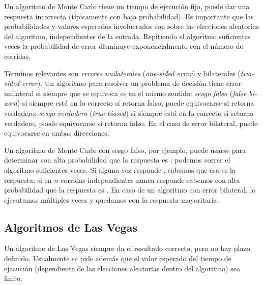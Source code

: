    Un algoritmo de Monte Carlo tiene un tiempo de ejecución fijo,
   puede dar una respuesta incorrecta
   (típicamente con baja probabilidad).
   Es importante que las probabilidades y valores esperados involucrados
   son sobre las elecciones aleatorias del algoritmo,
   independientes de la entrada.
   Repitiendo el algoritmo suficientes veces
   la probabilidad de error
   disminuye exponencialmente con el número de corridas.

   Términos relevantes son \emph{errores unilaterales}
   (\emph{\foreignlanguage{english}{one-sided error}})
   y bilaterales
   (\emph{\foreignlanguage{english}{two-sided error}}).
   Un algoritmo para resolver un problema de decisión tiene error unilateral
   si siempre que se equivoca es en el mismo sentido:
   \emph{sesgo falso}
   (\emph{\foreignlanguage{english}{false biased}})
   si siempre está en lo correcto si retorna falso,
   puede equivocarse si retorna verdadero;
   \emph{sesgo verdadero}
   (\emph{\foreignlanguage{english}{true biased}})
   si siempre está en lo correcto si retorna verdadero,
   puede equivocarse si retorna falso.
   En el caso de error bilateral,
   puede equivocarse en ambas direcciones.

   Un algoritmo de Monte Carlo con sesgo falso,
   por ejemplo,
   puede usarse para determinar con alta probabilidad
   que la respuesta es :
   podemos correr el algoritmo suficientes veces.
   Si alguna vez responde ,
   sabemos que esa es la respuesta;
   si en \(n\) corridas independientes nunca responde 
   sabemos con alta probabilidad que la respuesta es .
   En caso de un algoritmo con error bilateral,
   lo ejecutamos múltiples veces
   y quedamos con la respuesta mayoritaria.

\subsection{Algoritmos de Las Vegas}
\label{sec:algoritmos-las-vegas}

   Un algoritmo de Las Vegas
   siempre da el resultado correcto,
   pero no hay plazo definido.
   Usualmente se pide además
   que el valor esperado del tiempo de ejecución
   (dependiente de las elecciones aleatorias dentro del algoritmo)
   sea finito.

